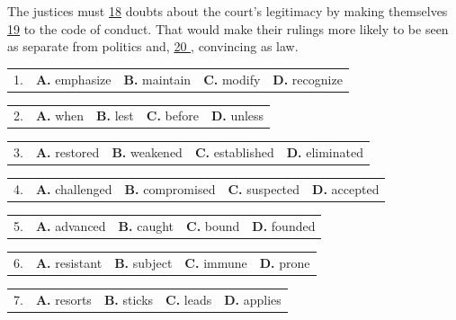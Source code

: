 \documentclass[UTF8,11pt]{ctexart}
\begin{document}
The justices must \uline{18} doubts about the court’s legitimacy by making themselves \uline{19} to the code of conduct. That would make their rulings more likely to be seen as separate from politics and, \uline{20 }, convincing as law.


\noindent\begin{tabularx}{\linewidth}{@{}lXXXX@{}}1. & \textbf{A.} emphasize & \textbf{B.} maintain & \textbf{C.} modify & \textbf{D.} recognize\\\end{tabularx}\par

\noindent\begin{tabularx}{\linewidth}{@{}lXXXX@{}}2. & \textbf{A.} when & \textbf{B.} lest & \textbf{C.} before & \textbf{D.} unless\\\end{tabularx}\par

\noindent\begin{tabularx}{\linewidth}{@{}lXXXX@{}}3. & \textbf{A.} restored & \textbf{B.} weakened & \textbf{C.} established & \textbf{D.} eliminated\\\end{tabularx}\par

\noindent\begin{tabularx}{\linewidth}{@{}lXXXX@{}}4. & \textbf{A.} challenged & \textbf{B.} compromised & \textbf{C.} suspected & \textbf{D.} accepted\\\end{tabularx}\par

\noindent\begin{tabularx}{\linewidth}{@{}lXXXX@{}}5. & \textbf{A.} advanced & \textbf{B.} caught & \textbf{C.} bound & \textbf{D.} founded\\\end{tabularx}\par

\noindent\begin{tabularx}{\linewidth}{@{}lXXXX@{}}6. & \textbf{A.} resistant & \textbf{B.} subject & \textbf{C.} immune & \textbf{D.} prone\\\end{tabularx}\par

\noindent\begin{tabularx}{\linewidth}{@{}lXXXX@{}}7. & \textbf{A.} resorts & \textbf{B.} sticks & \textbf{C.} leads & \textbf{D.} applies\\\end{tabularx}\par
\end{document}
